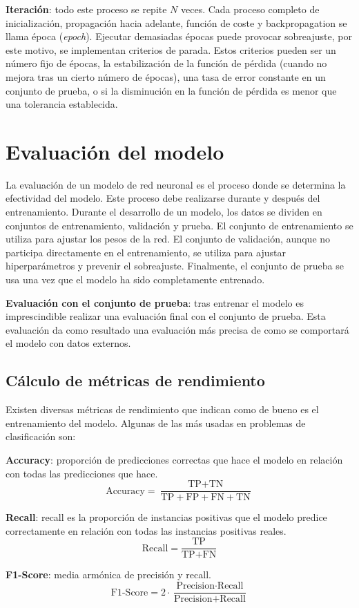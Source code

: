 \textbf{Iteración}: todo este proceso se repite $N$ veces. Cada proceso completo de inicialización, propagación hacia adelante, función de coste y backpropagation se llama época (\textit{epoch}). Ejecutar demasiadas épocas puede provocar sobreajuste, por este motivo, se implementan criterios de parada. Estos criterios pueden ser un número fijo de épocas, la estabilización de la función de pérdida (cuando no mejora tras un cierto número de épocas), una tasa de error constante en un conjunto de prueba, o si la disminución en la función de pérdida es menor que una tolerancia establecida.

\section{Evaluación del modelo}
La evaluación de un modelo de red neuronal es el proceso donde se determina la efectividad del modelo. Este proceso debe realizarse durante y después del entrenamiento.
Durante el desarrollo de un modelo, los datos se dividen en conjuntos de entrenamiento, validación y prueba. El conjunto de entrenamiento se utiliza para ajustar los pesos de la red. El conjunto de validación, aunque no participa directamente en el entrenamiento, se utiliza para ajustar hiperparámetros y prevenir el sobreajuste. Finalmente, el conjunto de prueba se usa una vez que el modelo ha sido completamente entrenado. \cite{Jordan_2018}

\textbf{Evaluación con el conjunto de prueba}: tras entrenar el modelo es imprescindible realizar una evaluación final con el conjunto de prueba. Esta evaluación da como resultado una evaluación más precisa de como se comportará el modelo con datos externos.

\subsection{Cálculo de métricas de rendimiento}
Existen diversas métricas de rendimiento que indican como de bueno es el entrenamiento del modelo. Algunas de las más usadas en problemas de clasificación son:

\textbf{Accuracy}: proporción de predicciones correctas que hace el modelo en relación con todas las predicciones que hace.
\begin{equation}
\text{Accuracy} = \frac{\text{TP} + \text{TN}}{\text{TP} + \text{FP} + \text{FN} + \text{TN}}
\end{equation}

\textbf{Recall}: recall es la proporción de instancias positivas que el modelo predice correctamente en relación con todas las instancias positivas reales.
\begin{equation}
\text{Recall} = \frac{\text{TP}}{\text{TP} + \text{FN}}
\end{equation}

\textbf{F1-Score}: media armónica de precisión y recall.
\begin{equation}
\text{F1-Score} = 2 \cdot \frac{\text{Precision} \cdot \text{Recall}}{\text{Precision} + \text{Recall}}
\end{equation}
